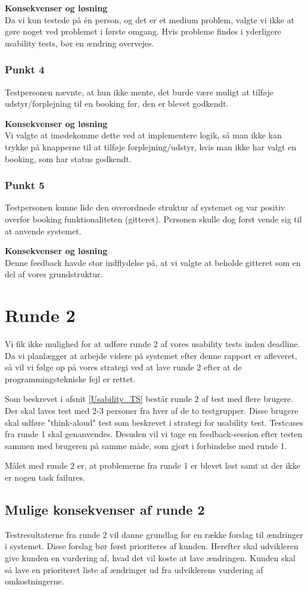 \textbf{Konsekvenser og løsning}
\\Da vi kun testede på én person, og det er et medium problem, valgte vi ikke at gøre noget ved problemet i første omgang. Hvis probleme findes i yderligere usability tests, bør en ændring overvejes.

\subsubsection*{Punkt 4}
Testpersonen nævnte, at hun ikke mente, det burde være muligt at tilføje udstyr/forplejning til en booking før, den er blevet godkendt.

\textbf{Konsekvenser og løsning}
\\Vi valgte at imødekomme dette ved at implementere logik, så man ikke kan trykke på knapperne til at tilføje forplejning/udstyr, hvis man ikke har valgt en booking, som har status godkendt.

\subsubsection*{Punkt 5}
Testpersonen kunne lide den overordnede struktur af systemet og var positiv overfor booking funktionaliteten (gitteret). Personen skulle dog først vende sig til at anvende systemet.

\textbf{Konsekvenser og løsning}
\\Denne feedback havde stor indflydelse på, at vi valgte at beholde gitteret som en del af vores grundstruktur.

\section{Runde 2}
\label{Usability_R2}
Vi fik ikke mulighed for at udføre runde 2 af vores usability tests inden deadline. Da vi planlægger at arbejde videre på systemet efter denne rapport er afleveret, så vil vi følge op på vores strategi ved at lave runde 2 efter at de programmingstekniske fejl er rettet.

Som beskrevet i afsnit \ref{Usability_TS} består runde 2 af test med flere brugere. Der skal laves test med 2-3 personer fra hver af de to testgrupper. Disse brugere skal udføre "think-aloud" test som beskrevet i strategi for usability test. Testcases fra runde 1 skal genanvendes. Desuden vil vi tage en feedback-session efter testen sammen med brugeren på samme måde, som gjort i forbindelse med runde 1.

Målet med runde 2 er, at problemerne fra runde 1 er blevet løst samt at der ikke er nogen task failures.

\subsection{Mulige konsekvenser af runde 2}
\label{Usability_R2_cons}
Testresultaterne fra runde 2 vil danne grundlag for en række forslag til ændringer i systemet. Disse forslag bør først prioriteres af kunden. Herefter skal udvikleren give kunden en vurdering af, hvad det vil koste at lave ændringen. Kunden skal så lave en prioriteret liste af ændringer ud fra udviklerens vurdering af omkostningerne.